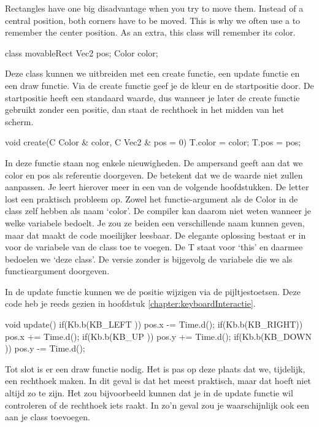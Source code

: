 Rectangles have one big disadvantage when you try to move them. Instead of a central position, both corners have to be moved. This is why we often use a  to remember the center position. As an extra, this class will remember its color.


\begin{code}
class movableRect {
  	Vec2 pos;
	Color color;
}
\end{code}


Deze class kunnen we uitbreiden met een create functie, een update functie en een draw functie. Via de create functie geef je de kleur en de startpositie door. De startpositie heeft een standaard waarde, dus wanneer je later de create functie gebruikt zonder een positie, dan staat de rechthoek in het midden van het scherm.

\begin{code}
void create(C Color & color, C Vec2 & pos = 0) {
  T.color = color;
	T.pos = pos;
}
\end{code}

\begin{note}
In deze functie staan nog enkele nieuwigheden. De ampersand geeft aan dat we color en pos als referentie doorgeven. De  betekent dat we de waarde niet zullen aanpassen. Je leert hierover meer in een van de volgende hoofdstukken. De letter  lost een praktisch probleem op. Zowel het functie-argument als de Color in de class zelf hebben als naam `color'. De compiler kan daarom niet weten wanneer je welke variabele bedoelt. Je zou ze beiden een verschillende naam kunnen geven, maar dat maakt de code moeilijker leesbaar. De elegante oplossing bestaat er in  voor de variabele van de class toe te voegen. De T staat voor `this' en daarmee bedoelen we `deze class'. De versie zonder  is bijgevolg de variabele die we als functieargument doorgeven.
\end{note}

In de update functie kunnen we de positie wijzigen via de pijltjestoetsen. Deze code heb je reeds gezien in hoofdstuk \ref{chapter:keyboardInteractie}.

\begin{code}
void update() {
	if(Kb.b(KB_LEFT )) pos.x -= Time.d();
	if(Kb.b(KB_RIGHT)) pos.x += Time.d();
	if(Kb.b(KB_UP   )) pos.y += Time.d();
	if(Kb.b(KB_DOWN )) pos.y -= Time.d();
}
\end{code}


Tot slot is er een draw functie nodig. Het is pas op deze plaats dat we, tijdelijk, een rechthoek maken. In dit geval is dat het meest praktisch, maar dat hoeft niet altijd zo te zijn. Het zou bijvoorbeeld kunnen dat je in de update functie wil controleren of de rechthoek iets raakt. In zo'n geval zou je waarschijnlijk ook een  aan je class toevoegen.


